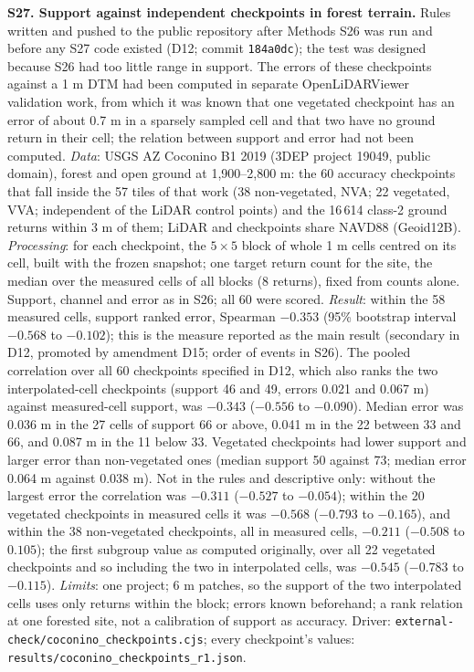 \documentclass[11pt]{article}
\begin{document}
\vspace{4mm}
\noindent\textbf{S27. Support against independent checkpoints in forest terrain.} Rules written and pushed to the public repository after Methods S26 was run and before any S27 code existed (D12; commit \texttt{184a0dc}); the test was designed because S26 had too little range in support. The errors of these checkpoints against a 1 m DTM had been computed in separate OpenLiDARViewer validation work, from which it was known that one vegetated checkpoint has an error of about 0.7 m in a sparsely sampled cell and that two have no ground return in their cell; the relation between support and error had not been computed. \emph{Data}: USGS AZ Coconino B1 2019 (3DEP project 19049, public domain), forest and open ground at 1,900--2,800 m: the 60 accuracy checkpoints that fall inside the 57 tiles of that work (38 non-vegetated, NVA; 22 vegetated, VVA; independent of the LiDAR control points) and the 16\,614 class-2 ground returns within 3 m of them; LiDAR and checkpoints share NAVD88 (Geoid12B). \emph{Processing}: for each checkpoint, the $5\times5$ block of whole 1 m cells centred on its cell, built with the frozen snapshot; one target return count for the site, the median over the measured cells of all blocks (8 returns), fixed from counts alone. Support, channel and error as in S26; all 60 were scored. \emph{Result}: within the 58 measured cells, support ranked error, Spearman $-0.353$ (95\% bootstrap interval $-0.568$ to $-0.102$); this is the measure reported as the main result (secondary in D12, promoted by amendment D15; order of events in S26). The pooled correlation over all 60 checkpoints specified in D12, which also ranks the two interpolated-cell checkpoints (support 46 and 49, errors 0.021 and 0.067 m) against measured-cell support, was $-0.343$ ($-0.556$ to $-0.090$). Median error was 0.036 m in the 27 cells of support 66 or above, 0.041 m in the 22 between 33 and 66, and 0.087 m in the 11 below 33. Vegetated checkpoints had lower support and larger error than non-vegetated ones (median support 50 against 73; median error 0.064 m against 0.038 m). Not in the rules and descriptive only: without the largest error the correlation was $-0.311$ ($-0.527$ to $-0.054$); within the 20 vegetated checkpoints in measured cells it was $-0.568$ ($-0.793$ to $-0.165$), and within the 38 non-vegetated checkpoints, all in measured cells, $-0.211$ ($-0.508$ to $0.105$); the first subgroup value as computed originally, over all 22 vegetated checkpoints and so including the two in interpolated cells, was $-0.545$ ($-0.783$ to $-0.115$). \emph{Limits}: one project; 6 m patches, so the support of the two interpolated cells uses only returns within the block; errors known beforehand; a rank relation at one forested site, not a calibration of support as accuracy. Driver: \texttt{external-check/coconino\_checkpoints.cjs}; every checkpoint's values: \texttt{results/coconino\_checkpoints\_r1.json}.
\end{document}
